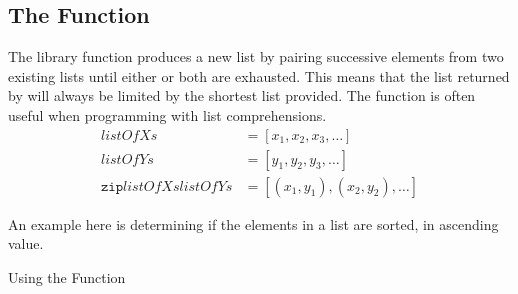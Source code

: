 \subsection{The \texorpdfstring{}{texttt{zip}} Function}\label{subsec:Zip_Function}
The library function  produces a new list by pairing successive elements from two existing lists until either or both are exhausted.
This means that the list returned by  will always be limited by the shortest list provided.
The  function is often useful when programming with list comprehensions.
\begin{align*}
  listOfXs &= [x_{1}, x_{2}, x_{3}, \ldots] \\
  listOfYs &= [y_{1}, y_{2}, y_{3}, \ldots] \\
  \mathtt{zip} listOfXs listOfYs &= [(x_{1}, y_{1}), (x_{2}, y_{2}), \ldots]
\end{align*}


An example here is determining if the elements in a list are sorted, in ascending value.
\begin{listing}[h!tbp]
\caption{Using the  Function}
\label{lst:Zip_Function}
\end{listing}

